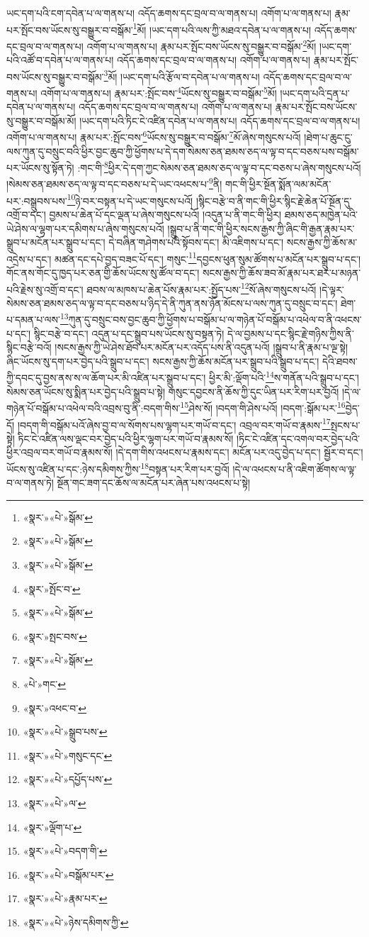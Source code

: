 ཡང་དག་པའི་ངག་དབེན་པ་ལ་གནས་པ། འདོད་ཆགས་དང་བྲལ་བ་ལ་གནས་པ། འགོག་པ་ལ་གནས་པ། རྣམ་པར་སྤོང་བས་ཡོངས་སུ་བསྒྱུར་བ་བསྒོམ་\footnote{«སྣར་»«པེ་»སྒོམ་}མོ། །ཡང་དག་པའི་ལས་ཀྱི་མཐའ་དབེན་པ་ལ་གནས་པ། འདོད་ཆགས་དང་བྲལ་བ་ལ་གནས་པ། འགོག་པ་ལ་གནས་པ། རྣམ་པར་སྤོང་བས་ཡོངས་སུ་བསྒྱུར་བ་བསྒོམ་\footnote{«སྣར་»«པེ་»སྒོམ་}མོ། །ཡང་དག་པའི་འཚོ་བ་དབེན་པ་ལ་གནས་པ། འདོད་ཆགས་དང་བྲལ་བ་ལ་གནས་པ། འགོག་པ་ལ་གནས་པ། རྣམ་པར་སྤོང་བས་ཡོངས་སུ་བསྒྱུར་བ་བསྒོམ་\footnote{«སྣར་»«པེ་»སྒོམ་}མོ། །ཡང་དག་པའི་རྩོལ་བ་དབེན་པ་ལ་གནས་པ། འདོད་ཆགས་དང་བྲལ་བ་ལ་གནས་པ། འགོག་པ་ལ་གནས་པ། རྣམ་པར་:སྤོང་བས་\footnote{«སྣར་»སྤོང་བ་}ཡོངས་སུ་བསྒྱུར་བ་བསྒོམ་\footnote{«སྣར་»«པེ་»སྒོམ་}མོ། །ཡང་དག་པའི་དྲན་པ་དབེན་པ་ལ་གནས་པ། འདོད་ཆགས་དང་བྲལ་བ་ལ་གནས་པ། འགོག་པ་ལ་གནས་པ། རྣམ་པར་སྤོང་བས་ཡོངས་སུ་བསྒྱུར་བ་བསྒོམ་མོ། །ཡང་དག་པའི་ཏིང་ངེ་འཛིན་དབེན་པ་ལ་གནས་པ། འདོད་ཆགས་དང་བྲལ་བ་ལ་གནས་པ། འགོག་པ་ལ་གནས་པ། རྣམ་པར་:སྤོང་བས་\footnote{«སྣར་»སྤང་བས་}ཡོངས་སུ་བསྒྱུར་བ་བསྒོམ་\footnote{«སྣར་»«པེ་»སྒོམ་}མོ་ཞེས་གསུངས་པའོ། །ཐེག་པ་ཆུང་ངུ་ལས་ཀུན་དུ་བསྲུང་བའི་ཕྱིར་བྱང་ཆུབ་ཀྱི་ཕྱོགས་པ་དེ་དག་སེམས་ཅན་ཐམས་ཅད་ལ་ལྟ་བ་དང་བཅས་པས་བསྒོམ་པར་ཡོངས་སུ་སྟོན་ཏེ། :གང་གི་\footnote{«པེ་»གང་}ཕྱིར་དེ་དག་ཀྱང་སེམས་ཅན་ཐམས་ཅད་ལ་ལྟ་བ་དང་བཅས་པ་ཞེས་གསུངས་པའོ། །སེམས་ཅན་ཐམས་ཅད་ལ་ལྟ་བ་དང་བཅས་པ་དེ་ཡང་འཕངས་པ་\footnote{«སྣར་»འཕང་བ་}ནི། གང་གི་ཕྱིར་སྔོན་སྨོན་ལམ་མངོན་པར་:བསྒྲུབས་པས་\footnote{«སྣར་»«པེ་»སྒྲུབ་པས་}ཉེ་བར་བསྟན་པ་དེ་ཡང་གསུངས་པའོ། །སྙིང་བརྩེ་བ་ནི་གང་གི་ཕྱིར་སྙིང་རྗེ་ཆེན་པོ་སྔོན་དུ་འགྲོ་བ་དང་། བྱམས་པ་ཆེན་པོ་དང་ལྡན་པ་ཞེས་གསུངས་པའོ། །འདུན་པ་ནི་གང་གི་ཕྱིར། ཐམས་ཅད་མཁྱེན་པའི་ཡེ་ཤེས་ལ་ལྷག་པར་དམིགས་པ་ཞེས་གསུངས་པའོ། །སྒྲུབ་པ་ནི་གང་གི་ཕྱིར་སངས་རྒྱས་ཀྱི་ཞིང་གི་རྒྱན་རྣམ་པར་སྒྲུབ་པ་མངོན་པར་སྒྲུབ་པ་དང་། དེ་བཞིན་གཤེགས་པའི་སྟོབས་དང་། མི་འཇིགས་པ་དང་། སངས་རྒྱས་ཀྱི་ཆོས་མ་འདྲེས་པ་དང་། མཚན་དང་དཔེ་བྱད་བཟང་པོ་དང་། གསུང་\footnote{«སྣར་»«པེ་»གསུང་དང་}དབྱངས་ཕུན་སུམ་ཚོགས་པ་མངོན་པར་སྒྲུབ་པ་དང་། གོང་ནས་གོང་དུ་ཁྱད་པར་ཅན་གྱི་ཆོས་ཡོངས་སུ་ཚོལ་བ་དང་། སངས་རྒྱས་ཀྱི་ཆོས་ཟབ་མོ་རྣམ་པར་ཐར་པ་མཉན་པའི་རྗེས་སུ་འགྲོ་བ་དང་། ཐབས་ལ་མཁས་པ་ཆེན་པོས་རྣམ་པར་:སྤྱོད་པས་\footnote{«སྣར་»«པེ་»དཔྱོད་པས་}སོ་ཞེས་གསུངས་པའོ། །དེ་ལྟར་སེམས་ཅན་ཐམས་ཅད་ལ་ལྟ་བ་དང་བཅས་པ་ཉིད་དེ་ནི་ཀུན་ནས་ཉོན་མོངས་པ་ལས་ཀུན་དུ་བསྲུང་བ་དང་། ཐེག་པ་དམན་པ་ལས་\footnote{«སྣར་»«པེ་»ལ་}ཀུན་དུ་བསྲུང་བས་བྱང་ཆུབ་ཀྱི་ཕྱོགས་པ་བསྒོམ་པ་ལ་གཉེན་པོ་བསྒོམ་པ་འཕེལ་བ་ནི་འཕངས་པ་དང་། སྙིང་བརྩེ་བ་དང་། འདུན་པ་དང་སྒྲུབ་པས་ཡོངས་སུ་བསྟན་ཏེ། དེ་ལ་བྱམས་པ་དང་སྙིང་རྗེ་གཉིས་ཀྱིས་ནི་སྙིང་བརྩེ་བའོ། །སངས་རྒྱས་ཀྱི་ཡེ་ཤེས་ཐོབ་པར་མངོན་པར་འདོད་པས་ནི་འདུན་པའོ། །སྒྲུབ་པ་ནི་རྣམ་པ་ལྔ་སྟེ། ཞིང་ཡོངས་སུ་དག་པར་བྱེད་པའི་སྒྲུབ་པ་དང་། སངས་རྒྱས་ཀྱི་ཆོས་མངོན་པར་སྒྲུབ་པའི་སྒྲུབ་པ་དང་། དེའི་ཐབས་ཀྱི་དབང་དུ་བྱས་ནས་ས་ལ་ཆོག་པར་མི་འཛིན་པར་སྒྲུབ་པ་དང་། ཕྱིར་མི་:ལྡོག་པའི་\footnote{«སྣར་»ལྡོག་པ་}ས་གནོན་པའི་སྒྲུབ་པ་དང་། སེམས་ཅན་ཡོངས་སུ་སྨིན་པར་བྱེད་པའི་སྒྲུབ་པ་སྟེ། གསུང་དབྱངས་ནི་ཆོས་ཀྱི་དུང་ཡིན་པར་རིག་པར་བྱའོ། །དེ་ལ་གཉེན་པོ་བསྒོམ་པ་འཕེལ་བའི་འབྲས་བུ་ནི་:བདག་གིས་\footnote{«སྣར་»«པེ་»བདག་གི་}ཤེས་སོ། །བདག་གི་ཤེས་པའོ། །བདག་:སྒོམ་པར་\footnote{«སྣར་»«པེ་»བསྒོམ་པར་}བྱེད་དོ། །བདག་གི་བསྒོམ་པའོ་ཞེས་བྱ་བ་ལ་སོགས་པས་ལྷག་པར་གཡོ་བ་དང་། འབྲལ་བར་གཡོ་བ་རྣམས་\footnote{«སྣར་»«པེ་»རྣམ་པར་}སྤངས་པ་སྟེ། ཏིང་ངེ་འཛིན་ལས་ལྡང་བར་བྱེད་པའི་ཕྱིར་ལྷག་པར་གཡོ་བ་རྣམས་སོ། །ཏིང་ངེ་འཛིན་དང་འགལ་བར་བྱེད་པའི་ཕྱིར་འབྲལ་བར་གཡོ་བ་རྣམས་སོ། །དེ་དག་གིས་འཕངས་པ་རྣམས་དང་། མངོན་པར་འདུ་བྱེད་པ་དང་། སྦྱོར་བ་དང་། ཡོངས་སུ་འཛིན་པ་དང་:ཉེས་དམིགས་ཀྱིས་\footnote{«སྣར་»«པེ་»ཉེས་དམིགས་ཀྱི་}བསྟན་པར་རིག་པར་བྱའོ། །དེ་ལ་འཕངས་པ་ནི་འཇིག་ཚོགས་ལ་ལྟ་བ་ལ་གནས་ཏེ། སྔོན་གང་ཟག་དང་ཆོས་ལ་མངོན་པར་ཞེན་པས་འཕངས་པ་སྟེ། 